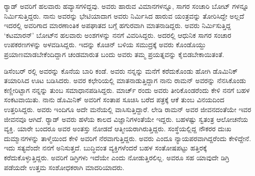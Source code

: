 ರ‍್ಯಾಡ್ ಅವರಿಗೆ ಹಲವಾರು ಹವ್ಯಾಸಗಳಿದ್ದವು. ಅವರು ಹಾರುವ ವಿಮಾನಗಳನ್ನೂ, ಸಾಗರ ಸಂಚಾರಿ ಬೋಟ್ ಗಳನ್ನೂ ನಿರ್ಮಿಸುತ್ತಿದ್ದರು. ನಾನು ಅವರನ್ನು ಭೇಟಿಯಾದಾಗ ಅವರು ನಿರ್ಮಿಸಿದ ಹಾರುವ ಯಂತ್ರವನ್ನು ತೋರಿಸಿದ್ದೇ ಅಲ್ಲದೆ ಇದರಲ್ಲಿ ಅವರಿಗಾದ ಮಾರಣಾಂತಿಕ ಅಪಘಾತದ ಬಗ್ಗೆ ಹಗುರವಾಗಿ ಮಾತನಾಡಿದ್ದರು. ಅವರು ನಿರ್ಮಿಸುತ್ತಿದ್ದ ‘ಕಟಮಾರನ್’ ಬೋಟ್‍ನ ಹಲವಾರು ಅಂಶಗಳನ್ನು ನನಗೆ ವಿವರಿಸಿದ್ದರು. ಅದರಲ್ಲಿ ಆಧುನಿಕ ಸಾಗರ ಸಂಚಾರ ಉಪಕರಣಗಳನ್ನು ಅಳವಡಿಸಿದ್ದರು. ಇದನ್ನು ಕೊಚಿನ್ ಬಳಿಯ ಸಮುದ್ರಕ್ಕೆ ಅವರು ಕೊಂಡೊಯ್ದು ಪ್ರಯಾಣಮಾಡಬೇಕೆಂದಿದ್ದಾಗ ಚಂಡಮಾರುತ ಬಂದು ಅವರು ತಮ್ಮ ಪ್ರಯತ್ನವನ್ನು ಕೈಬಿಡ\-ಬೇಕಾಯಿತಂತೆ.

ಡಿಸೆಂಬರ್ ರಲ್ಲಿ ಅವರನ್ನು ಕೊನೆಯ ಬಾರಿ ಕಂಡೆ. ಅವರು ನನ್ನನ್ನು ಮನೆಗೆ ಕರೆದುಕೊಂಡು ಹೋಗಿ ಡೊಮಿನಿಕ್ ತಯಾರಿಸಿದ ಊಟ ಬಡಿಸಿದರು. ಅವರ ಕಛೇರಿಯಲ್ಲಿ ಮಾತನಾಡುತ್ತಿದ್ದಾಗ ನಾನು ರಾಮನ್ ಅವರನ್ನು ನೆನಸಿಕೊಂಡು ಕಣ್ಣೀರಿಟ್ಟಾಗ ನನ್ನನ್ನು ತುಂಬ ಸಮಾಧಾನಪಡಿಸಿದ್ದರು.  ಮಾರ್ಚ್  ರಂದು ಅವರು ತೀರಿಕೊಂಡರೆಂದು ಕೇಳಿ ನನಗೆ ಬಹಳ ಸಂಕಟವಾಯಿತು. ನಾನು ಡೊಮಿನಿಕ್ ಅವರಿಗೆ ಸಂತಾಪ ಸೂಚಿಸಿ ಬರೆದ ಪತ್ರಕ್ಕೆ ಆಕೆ ತುಂಬ ವಿನಯದಿಂದ ಉತ್ತರಿಸಿದ್ದರು. ಅವರು ಇಂದಿಗೂ ಅದೇ ಮನೆಯಲ್ಲಿ ವಾಸಿಸುತ್ತಿದ್ದಾರೆ. ಲೇಡಿ ರಾಮನ್ ಅವರ ಜೀವನದಂತೆಯೇ ಇವರ ಜೀವನವೂ ಆಗಿದೆ. ರ‍್ಯಾಡ್ ಅವರು ಹಳೆಯ ಕಾಲದ ವಿಜ್ಞಾನಿಗಳಂತೆಯೇ ಇದ್ದರು. ಬಹಳಷ್ಟು ಸ್ವತಂತ್ರ ಆಲೋಚನೆಯ ವ್ಯಕ್ತಿ. ಯಾರೇ ಬಂದರೂ ಅವರ ಅಂತಸ್ತು ನೋಡದೆ ಆತ್ಮೀಯರಾಗಿರುತ್ತಿದ್ದರು. ಸಂಸ್ಥೆಯಲ್ಲಿದ್ದ ನೌಕರರ ದುಃಖ ದುಮ್ಮಾನಗಳನ್ನು ತಾಳ್ಮೆಯಿಂದ ಕೇಳಿ ಅವರಿಗೆ ನೆರವಾಗುತ್ತಿದ್ದರು. ಅವರು ಎಂದೂ ನ್ಯಾಯಪರವಾಗಿದ್ದರೆಂದು ಕೇಳಿದ್ದೇನೆ. ಇದು ಸತ್ಯವೆಂದೇ ನನಗೆ ಅನಿಸುತ್ತದೆ. ಬುದ್ಧಿವಂತ ವ್ಯಕ್ತಿಗಳೆಂದರೆ ಬಹಳ ಸಂತೋಷಪಟ್ಟು ಹತ್ತಿರಕ್ಕೆ ಕರೆದುಕೊಳ್ಳುತ್ತಿದ್ದರು. ಅವರಿಗೆ ಡಿಗ್ರಿಗಳು ಇದೆಯೇ ಎಂದು ನೋಡುತ್ತಿರಲಿಲ್ಲ. ಅವರೂ ಸಹ ಯಾವುದೇ ಡಿಗ್ರಿ ಪಡೆಯದೇ ಉತ್ತಮ ಸಂಶೋಧಕರಾಗಿ ಮಾದರಿಯಾದರು.

\newpage

